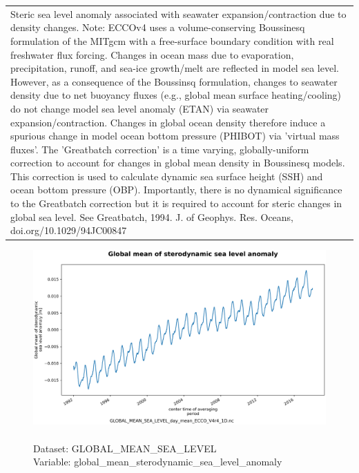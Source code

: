 \begin{longtable}{|p{}|p{}|p{}|p{}|}
\rowcolor{lightgray} \multicolumn{4}{|p{1.00\textwidth}|}{\textbf{Comments}} \\ \hline
\multicolumn{4}{|p{1\textwidth}|}{Steric sea level anomaly associated with seawater expansion/contraction due to density changes. Note: ECCOv4 uses a volume-conserving Boussinesq formulation of the MITgcm with a free-surface boundary condition with real freshwater flux forcing. Changes in ocean mass due to evaporation, precipitation, runoff, and sea-ice growth/melt are reflected in model sea level. However, as a consequence of the Boussinsq formulation, changes to seawater density due to net buoyancy fluxes (e.g., global mean surface heating/cooling) do not change model sea level anomaly (ETAN) via seawater expansion/contraction. Changes in global ocean density therefore induce a spurious change in model ocean bottom pressure (PHIBOT) via 'virtual mass fluxes'. The 'Greatbatch correction' is a time varying, globally-uniform correction to account for changes in global mean density in Boussinesq models. This correction is used to calculate dynamic sea surface height (SSH) and ocean bottom pressure (OBP). Importantly, there is no dynamical significance to the Greatbatch correction but it is required to account for steric changes in global sea level. See Greatbatch, 1994. J. of Geophys. Res. Oceans, doi.org/10.1029/94JC00847} \\ \hline
\end{longtable}

\begin{figure}[H]
\centering
\includegraphics[scale=0.5]{../images/plots/oneD_plots/Global_Mean_Sea_Level/global_mean_sterodynamic_sea_level_anomaly.png}
\caption{\\Dataset: GLOBAL\_MEAN\_SEA\_LEVEL\\Variable: global\_mean\_sterodynamic\_sea\_level\_anomaly}
\label{tab:table-GLOBAL_MEAN_SEA_LEVEL_global_mean_sterodynamic_sea_level_anomaly-Plot}
\end{figure}
\pagebreak
